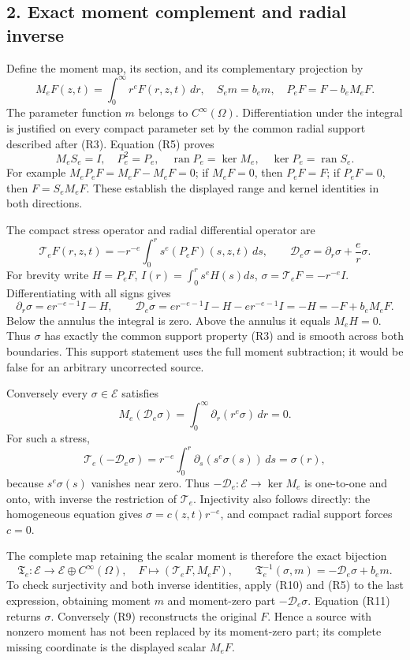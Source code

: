 \documentclass[10pt,a4paper]{article}
\begin{document}
\subsection{2. Exact moment complement and radial inverse}\label{nsupstream:radial_stress_reconstruction_audit:exact-moment-complement-and-radial-inverse}

Define the moment map, its section, and its complementary projection by \[
M_eF(z,t)=\int_0^\infty r^eF(r,z,t)\,dr,\quad
S_em=b_em,\quad
P_eF=F-b_eM_eF.
\tag{R6}
\] The parameter function \(m\) belongs to \(C^\infty(\Omega)\). Differentiation under the integral is justified on every compact parameter set by the common radial support described after (R3). Equation (R5) proves \[
M_eS_e=I,\quad P_e^2=P_e,\quad
\operatorname{ran}P_e=\ker M_e,\quad
\ker P_e=\operatorname{ran}S_e.
\tag{R7}
\] For example \(M_eP_eF=M_eF-M_eF=0\); if \(M_eF=0\), then \(P_eF=F\); if \(P_eF=0\), then \(F=S_eM_eF\). These establish the displayed range and kernel identities in both directions.

The compact stress operator and radial differential operator are \[
\mathcal T_eF(r,z,t)=-r^{-e}\int_0^r s^e(P_eF)(s,z,t)\,ds,
\qquad \mathcal D_e\sigma=\partial_r\sigma+\frac e r\sigma.
\tag{R8}
\] For brevity write \(H=P_eF\), \(I(r)=\int_0^rs^eH(s)ds\), \(\sigma=\mathcal T_eF=-r^{-e}I\). Differentiating with all signs gives \[
\partial_r\sigma=e r^{-e-1}I-H,\qquad
\mathcal D_e\sigma=e r^{-e-1}I-H-e r^{-e-1}I=-H=-F+b_eM_eF.
\tag{R9}
\] Below the annulus the integral is zero. Above the annulus it equals \(M_eH=0\). Thus \(\sigma\) has exactly the common support property (R3) and is smooth across both boundaries. This support statement uses the full moment subtraction; it would be false for an arbitrary uncorrected source.

Conversely every \(\sigma\in\mathcal E\) satisfies \[
M_e(\mathcal D_e\sigma)=\int_0^\infty\partial_r(r^e\sigma)\,dr=0.
\tag{R10}
\] For such a stress, \[
\mathcal T_e(-\mathcal D_e\sigma)
=r^{-e}\int_0^r\partial_s(s^e\sigma(s))\,ds=\sigma(r),
\tag{R11}
\] because \(s^e\sigma(s)\) vanishes near zero. Thus \(-\mathcal D_e:\mathcal E\to\ker M_e\) is one-to-one and onto, with inverse the restriction of \(\mathcal T_e\). Injectivity also follows directly: the homogeneous equation gives \(\sigma=c(z,t)r^{-e}\), and compact radial support forces \(c=0\).

The complete map retaining the scalar moment is therefore the exact bijection \[
\mathfrak T_e:\mathcal E\longrightarrow\mathcal E\oplus C^\infty(\Omega),
\quad F\longmapsto(\mathcal T_eF,M_eF),
\qquad
\mathfrak T_e^{-1}(\sigma,m)=-\mathcal D_e\sigma+b_em.
\tag{R12}
\] To check surjectivity and both inverse identities, apply (R10) and (R5) to the last expression, obtaining moment \(m\) and moment-zero part \(-\mathcal D_e\sigma\). Equation (R11) returns \(\sigma\). Conversely (R9) reconstructs the original \(F\). Hence a source with nonzero moment has not been replaced by its moment-zero part; its complete missing coordinate is the displayed scalar \(M_eF\).
\end{document}
